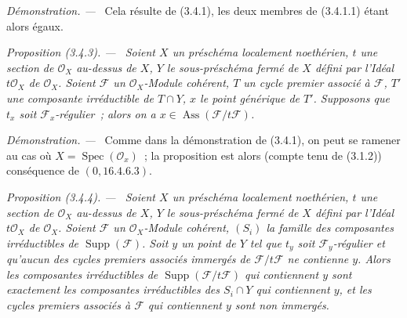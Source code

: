\documentclass[10pt,oneside]{book}
\newenvironment{proposition}[1][]{%
  \par\medskip\noindent\itshape Proposition (#1). ---\ }{\par}
\newenvironment{proof}{%
  \par\medskip\noindent\textit{Démonstration. ---\ }}{\par}
\begin{document}
\begin{proof}
Cela résulte de (3.4.1), les deux membres de (3.4.1.1) étant alors égaux.
\end{proof}

\begin{proposition}[3.4.3]
\label{IV.2.3.4.3-fr}
Soient $X$ un préschéma localement noethérien, $t$ une section de
$\mathcal O_X$ au-dessus de $X$, $Y$ le sous-préschéma fermé de $X$ défini par
l'Idéal $t\mathcal O_X$ de $\mathcal O_X$. Soient $\mathcal F$ un
$\mathcal O_X$-Module cohérent, $T$ un cycle premier associé à $\mathcal F$,
$T'$ une composante irréductible de $T\cap Y$, $x$ le point générique de
$T'$. Supposons que $t_x$ soit $\mathcal F_x$-régulier~; alors on a
$x\in\operatorname{Ass}(\mathcal F/t\mathcal F)$.
\end{proposition}

\begin{proof}
Comme dans la démonstration de (3.4.1), on peut se ramener au cas où
$X=\operatorname{Spec}(\mathcal O_x)$~; la proposition est alors (compte tenu
de (3.1.2)) conséquence de $(0,16.4.6.3)$.
\end{proof}

\begin{proposition}[3.4.4]
\label{IV.2.3.4.4-fr}
Soient $X$ un préschéma localement noethérien, $t$ une section de
$\mathcal O_X$ au-dessus de $X$, $Y$ le sous-préschéma fermé de $X$ défini par
l'Idéal $t\mathcal O_X$ de $\mathcal O_X$. Soient $\mathcal F$ un
$\mathcal O_X$-Module cohérent, $(S_i)$ la famille des composantes
irréductibles de $\operatorname{Supp}(\mathcal F)$. Soit $y$ un point de $Y$
tel que $t_y$ soit $\mathcal F_y$-régulier et qu'aucun des cycles premiers
associés immergés de $\mathcal F/t\mathcal F$ ne contienne $y$. Alors les
composantes irréductibles de $\operatorname{Supp}(\mathcal F/t\mathcal F)$ qui
contiennent $y$ sont exactement les composantes irréductibles des $S_i\cap Y$
qui contiennent $y$, et les cycles premiers associés à $\mathcal F$ qui
contiennent $y$ sont non immergés.
\end{proposition}
\end{document}

